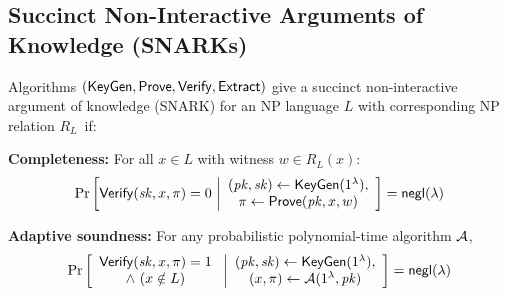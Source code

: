 \subsection{Succinct Non-Interactive Arguments of Knowledge (SNARKs)}
\label{app:SNARKs}
\begin{definition}[SNARK]
Algorithms $(\mathsf{KeyGen}, \mathsf{Prove}, \mathsf{Verify}, \mathsf{Extract})$
give a {\sf succinct non-interactive argument of knowledge (SNARK)}
for an NP language $L$
with corresponding NP relation  $R_L$~if:
\begin{description}
\item
\textbf{Completeness:}
For all $x \in L$ with witness $w \in R_L(x)$:
\[
\Pr\left[\mathsf{Verify}(\mathit{sk}, x, \pi) = 0 \ \bigg|
\begin{array}{c}
(\mathit{pk}, \mathit{sk}) \leftarrow \mathsf{KeyGen}(1^\lambda), \\
\pi\leftarrow \mathsf{Prove}(\mathit{pk}, x, w)
\end{array}
\right] = \mathsf{negl}(\lambda)
\]
\item
\textbf{Adaptive soundness:}
For any probabilistic polynomial-time algorithm $\mathcal{A}$,
\[
\Pr\left[
\begin{array}{c}
\mathsf{Verify}(\mathit{sk}, x, \pi) = 1  \\
\wedge \ (x \notin L)
\end{array}
\ \bigg|
\begin{array}{c}
(\mathit{pk}, \mathit{sk}) \leftarrow \mathsf{KeyGen}(1^\lambda), \\
(x, \pi) \leftarrow \mathcal{A}(1^\lambda, \mathit{pk})
\end{array}
\right] = \mathsf{negl}(\lambda)
\]


\end{description}
\end{definition}
